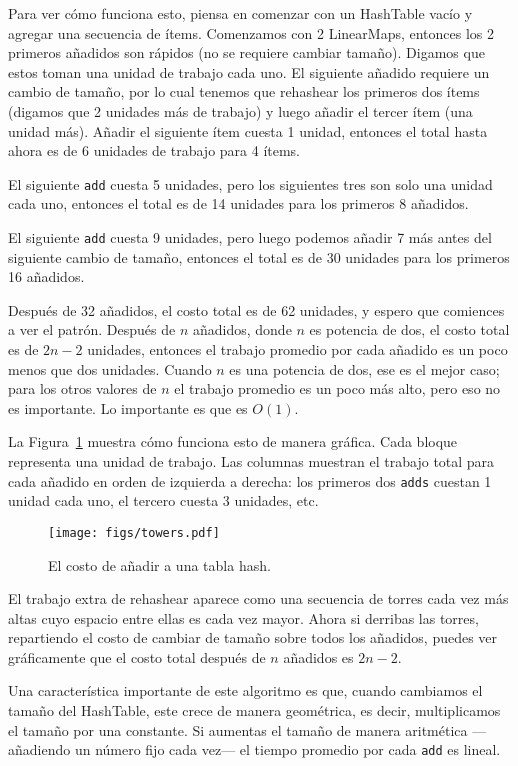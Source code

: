 \documentclass[10pt]{book}
\begin{document}
Para ver cómo funciona esto, piensa en comenzar con un
HashTable vacío y agregar una secuencia de ítems.  Comenzamos con 2 LinearMaps,
entonces los 2 primeros añadidos son rápidos (no se requiere cambiar tamaño).  Digamos
que estos toman una unidad de trabajo cada uno.  El siguiente añadido
requiere un cambio de tamaño, por lo cual tenemos que rehashear los primeros dos
ítems (digamos que 2 unidades más de trabajo) y luego
añadir el tercer ítem (una unidad más).  Añadir el siguiente ítem
cuesta 1 unidad, entonces el total hasta ahora es
de 6 unidades de trabajo para 4 ítems.

El siguiente {\tt add} cuesta 5 unidades, pero los siguientes tres
son solo una unidad cada uno, entonces el total es de 14 unidades para los
primeros 8 añadidos.

El siguiente {\tt add} cuesta 9 unidades, pero luego podemos añadir 7 más
antes del siguiente cambio de tamaño, entonces el total es de 30 unidades para los
primeros 16 añadidos.

Después de 32 añadidos, el costo total es de 62 unidades, y espero que comiences
a ver el patrón.  Después de $n$ añadidos, donde $n$ es potencia de dos, el
costo total es de $2n-2$ unidades, entonces el trabajo promedio por cada añadido es
un poco menos que dos unidades.  Cuando $n$ es una potencia de dos, ese es
el mejor caso; para los otros valores de $n$  el trabajo promedio es un poco
más alto, pero eso no es importante.  Lo importante es que
es $O(1)$.

La Figura~\ref{fig.hash} muestra cómo funciona esto de manera gráfica.  Cada
bloque representa una unidad de trabajo.  Las columnas muestran el trabajo
total para cada añadido en orden de izquierda a derecha: los primeros dos
{\tt adds} cuestan 1 unidad cada uno, el tercero cuesta 3 unidades, etc.

\begin{figure}
\centerline{\texttt{[image: figs/towers.pdf]}}
\caption{El costo de añadir a una tabla hash.\label{fig.hash}}
\end{figure}

El trabajo extra de rehashear aparece como una secuencia de torres
cada vez más altas cuyo espacio entre ellas es cada vez mayor.  Ahora si derribas
las torres, repartiendo el costo de cambiar de tamaño sobre todos los
añadidos, puedes ver gráficamente que el costo total después de $n$
añadidos es $2n - 2$.

Una característica importante de este algoritmo es que, cuando cambiamos el tamaño del
HashTable, este crece de manera geométrica, es decir, multiplicamos el tamaño por una
constante.  Si aumentas el tamaño de manera
aritmética ---añadiendo un número fijo cada vez--- el tiempo promedio
por cada {\tt add} es lineal.
\end{document}
